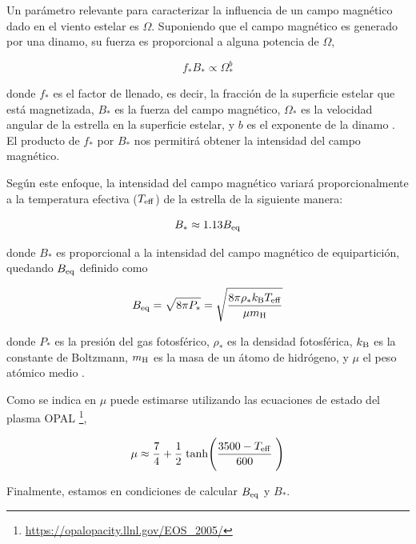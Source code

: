 Un parámetro relevante para caracterizar la influencia de un campo magnético dado en el viento estelar es $\Omega$. Suponiendo que el campo magnético es generado por una dinamo, su fuerza es proporcional a alguna potencia de $\Omega$,

\begin{equation}
	f_*B_* \propto \Omega_*^b \label{eq:mf_strenght}
\end{equation}

donde $f_*$ es el factor de llenado, es decir, la fracción de la superficie estelar que está magnetizada, $B_*$ es la fuerza del campo magnético, $\Omega_*$ es la velocidad angular de la estrella en la superficie estelar, y $b$ es el exponente de la dinamo \citep{Gallet2013}. El producto de $f_*$ por $B_*$ nos permitirá obtener la intensidad del campo magnético. \par

Según este enfoque, la intensidad del campo magnético variará proporcionalmente a la temperatura efectiva ($T_{\mathrm{eff}}$) de la estrella de la siguiente manera: 
\begin{ceqn}
	\begin{equation}
		B_* \approx 1.13 B_{\mathrm{eq}} \label{eq:mf_bstar}
	\end{equation}
\end{ceqn}

donde $B_*$ es proporcional a la intensidad del campo magnético de equipartición, quedando $B_{\mathrm{eq}}$ definido como 

\begin{equation}
	B_{\mathrm{eq}} = \sqrt{8\pi P_*} = \sqrt{\frac{8\pi\rho_* k_{\mathrm{B}} T_{\mathrm{eff}}}{\mu m_{\mathrm{H}}}}\label{eq:mf_beq}    
\end{equation}

donde $P_*$ es la presión del gas fotosférico, $\rho_*$ es la densidad fotosférica, $k_{\mathrm{B}}$ es la constante de Boltzmann, $m_{\mathrm{H}}$ es la masa de un átomo de hidrógeno, y $\mu$ el peso atómico medio \citep{Cranmer2011}. \par

Como se indica en \cite{Cranmer2011} $\mu$ puede estimarse utilizando las ecuaciones de estado del plasma OPAL \footnote{\url{https://opalopacity.llnl.gov/EOS_2005/}},

\begin{equation}
	\mu \approx \frac{7}{4} + \frac{1}{2} \; \textrm{tanh}\Bigg(\frac{3500-T_{\mathrm{eff}}}{600}\;\Bigg) \label{eq:mf_atom_weight}
\end{equation}

Finalmente, estamos en condiciones de calcular $B_{\mathrm{eq}}$ y $B_*$.\par

